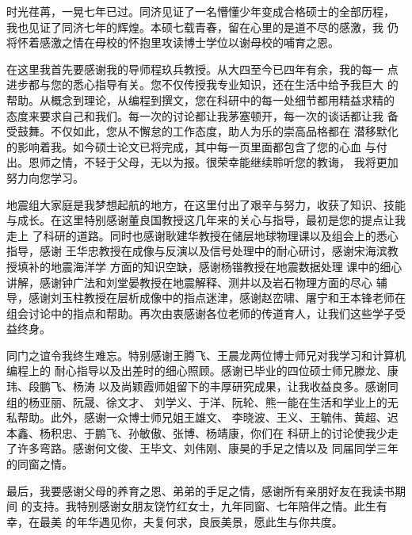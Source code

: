 
\begin{thanks}
	
时光荏苒，一晃七年已过。同济见证了一名懵懂少年变成合格硕士的全部历程，
我也见证了同济七年的辉煌。本硕七载青春，留在心里的是道不尽的感激，我
仍将怀着感激之情在母校的怀抱里攻读博士学位以谢母校的哺育之恩。

在这里我首先要感谢我的导师程玖兵教授。从大四至今已四年有余，我的每一
点进步都与您的悉心指导有关。您不仅传授我专业知识，还在生活中给予我巨大
的帮助。从概念到理论，从编程到撰文，您在科研中的每一处细节都用精益求精的
态度来要求自己和我们。每一次的讨论都让我茅塞顿开，每一次的谈话都让我
备受鼓舞。不仅如此，您从不懈怠的工作态度，助人为乐的崇高品格都在
潜移默化的影响着我。如今硕士论文已将完成，其中每一页里面都包含了您的心血
与付出。恩师之情，不轻于父母，无以为报。很荣幸能继续聆听您的教诲，
我将更加努力向您学习。

地震组大家庭是我梦想起航的地方，在这里付出了艰辛与努力，收获了知识、技能
与成长。在这里特别感谢董良国教授这几年来的关心与指导，最初是您的提点让我走上
了科研的道路。同时也感谢耿建华教授在储层地球物理课以及组会上的悉心指导，感谢
王华忠教授在成像与反演以及信号处理中的耐心研讨，感谢宋海滨教授填补的地震海洋学
方面的知识空缺，感谢杨锴教授在地震数据处理
课中的细心讲解，感谢钟广法和刘堂晏教授在地震解释、测井以及岩石物理方面的尽心
辅导，感谢刘玉柱教授在层析成像中的指点迷津，感谢赵峦啸、屠宁和王本锋老师在
组会讨论中的指点和帮助。再次由衷感谢各位老师的传道育人，让我们这些学子受益终身。

同门之谊令我终生难忘。特别感谢王腾飞、王晨龙两位博士师兄对我学习和计算机编程上的
耐心指导以及出差时的细心照顾。感谢已毕业的四位硕士师兄滕龙、康玮、段鹏飞、杨涛
以及尚颖霞师姐留下的丰厚研究成果，让我收益良多。感谢同组的杨亚丽、阮晟、徐文才、
刘学义、于洋、阮轮、熊一能在生活和学业上的无私帮助。此外，感谢一众博士师兄姐王雄文、
李晓波、王义、王毓伟、黄超、迟本鑫、杨积忠、于鹏飞、孙敏傲、张博、杨靖康，你们在
科研上的讨论使我少走了许多弯路。感谢何文俊、王毕文、刘伟刚、康昊的手足之情以及
同届同学三年的同窗之情。

最后，我要感谢父母的养育之恩、弟弟的手足之情，感谢所有亲朋好友在我读书期间
的支持。我特别感谢女朋友饶竹红女士，九年同窗、七年陪伴之情。此生有幸，在最美
的年华遇见你，夫复何求，良辰美景，愿此生与你共度。


\end{thanks}
